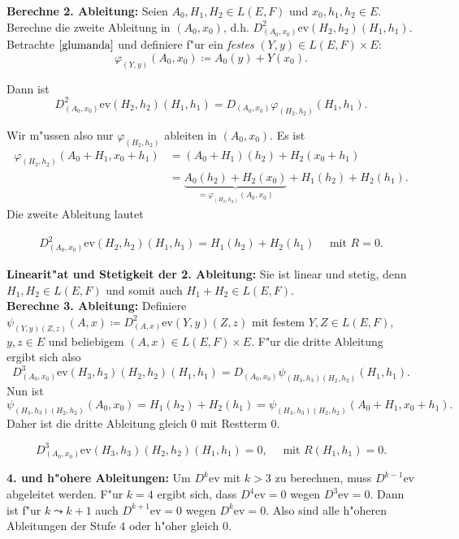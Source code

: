 \documentclass[a4paper, landscape,twocolumn,fontsize=8pt]{scrartcl}
\theoremstyle{plain}
\begin{document}
\textbf{Berechne 2. Ableitung:} Seien $A_0,H_1,H_2 \in L(E,F)$ und $x_0,h_1,h_2 \in E$. Berechne die zweite Ableitung in $(A_0,x_0)$, d.h.  $D_{(A_0,x_0)}^2\mathrm{ev}(H_2,h_2)(H_1,h_1)$. Betrachte $\eqref{glumanda}$ und definiere f"ur ein \emph{festes} $(Y,y) \in L(E,F) \times E$:
\[
    \varphi_{(Y,y)}(A_0,x_0) \coloneqq A_0(y) + Y(x_0).
\]

Dann ist 
\[
    D_{(A_0,x_0)}^2\mathrm{ev}(H_2,h_2)(H_1,h_1) = D_{(A_0,x_0)}\varphi_{(H_2,h_2)}(H_1,h_1).
\]

Wir m"ussen also nur $\varphi_{(H_2,h_2)}$ ableiten in $(A_0,x_0)$. Es ist 
\begin{align*}
    \varphi_{(H_2,h_2)}(A_0+H_1,x_0+h_1) &= (A_0+H_1)(h_2) + H_2(x_0+h_1) \\
    &= \underbrace{A_0(h_2) + H_2(x_0)}_{=\varphi_{(H_2,h_2)}(A_0,x_0)} + H_1(h_2) + H_2(h_1).
\end{align*}
Die zweite Ableitung lautet 
\begin{framed}
\begin{align*}
    D_{(A_0,x_0)}^2\mathrm{ev}(H_2,h_2)(H_1,h_1) = H_1(h_2) + H_2(h_1) \quad \text{ mit } R = 0.
\end{align*}
\end{framed}

\textbf{Linearit"at und Stetigkeit der 2. Ableitung: }Sie ist linear und stetig, denn $H_1,H_2 \in L(E,F)$ und somit auch $H_1+H_2 \in L(E,F)$.\\

\textbf{Berechne 3. Ableitung:} Definiere $\psi_{(Y,y)(Z,z)}(A,x) \coloneqq D^2_{(A,x)}\mathrm{ev}(Y,y)(Z,z)$ mit festem $Y,Z \in L(E,F)$, $y,z \in E$ und beliebigem $(A,x) \in L(E,F) \times E$. F"ur die dritte Ableitung ergibt sich also
\[
    D_{(A_0,x_0)}^3\mathrm{ev}(H_3,h_3)(H_2,h_2)(H_1,h_1) = D_{(A_0,x_0)}\psi_{(H_3,h_3)(H_2,h_2)}(H_1,h_1).
\]
Nun ist 
\[
    \psi_{(H_3,h_3)(H_2,h_2)}(A_0,x_0) = H_1(h_2) + H_2(h_1) = \psi_{(H_3,h_3)(H_2,h_2)}(A_0+H_1,x_0+h_1).
\]
Daher ist die dritte Ableitung gleich $0$ mit Restterm $0$.
\begin{framed}
\[
    D_{(A_0,x_0)}^3\mathrm{ev}(H_3,h_3)(H_2,h_2)(H_1,h_1) = 0, \quad \text{ mit } R(H_1,h_1) = 0.
\]
\end{framed}
\textbf{4. und h"ohere Ableitungen: }Um $D^k\mathrm{ev}$ mit $k > 3$ zu berechnen, muss $D^{k-1}\mathrm{ev}$ abgeleitet werden. F"ur $k=4$ ergibt sich, dass $D^{4}\mathrm{ev} = 0$ wegen $D^{3}\mathrm{ev} = 0$. Dann ist f"ur $k \leadsto k+1$ auch $D^{k+1}\mathrm{ev} = 0$ wegen $D^{k}\mathrm{ev} = 0$. Also sind alle h"oheren Ableitungen der Stufe $4$ oder h"oher gleich $0$.
\end{document}
